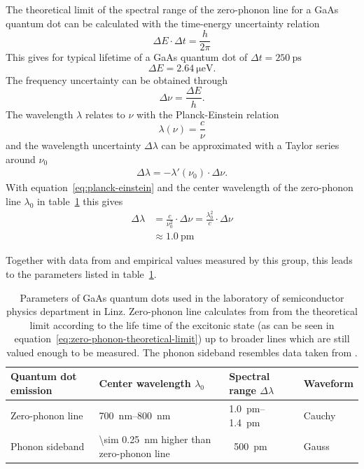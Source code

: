 The theoretical limit of the spectral range of the zero-phonon line for a GaAs quantum dot can be calculated with the time-energy uncertainty relation
\begin{equation}
\Delta E \cdot \Delta t = \frac{h}{2 \pi}
\end{equation}
This gives for typical lifetime of a GaAs quantum dot of $\Delta t = \SI{250}{\pico \second}$
\begin{equation}
\Delta E = \SI{2.64}{\micro \electronvolt}.
\end{equation}
The frequency uncertainty can be obtained through
\begin{equation}
\label{eq:planck-einstein}
\Delta \nu = \frac{\Delta E}{h}.
\end{equation}
The wavelength $\lambda$ relates to $\nu$ with the Planck-Einstein relation
\begin{equation}
\lambda(\nu) = \frac{c}{\nu}
\end{equation}
and the wavelength uncertainty $\Delta \lambda$ can be approximated with a Taylor series around $\nu_0$
\begin{align}
\Delta \lambda = - \lambda'(\nu_0)\cdot \Delta \nu.
\end{align}
With equation~\eqref{eq:planck-einstein} and the center wavelength of the zero-phonon line $\lambda_{0}$ in table~\ref{tab:quantum-dot-emission} this gives
\begin{align}
\Delta \lambda &= \frac{c}{\nu_0^2} \cdot \Delta \nu = \frac{\lambda_0^2}{c}\cdot\Delta \nu\\
\label{eq:zero-phonon-theoretical-limit}
&\approx \SI{1.0}{\pico \metre}
\end{align}

Together with data from \textcite{scholl_resonance_2019} and empirical values measured by this group, this leads to the parameters listed in table~\ref{tab:quantum-dot-emission}.

\begin{table}[H]
	\caption[Paramters of GaAs quantum dots used in the laboratory of semiconductor physics department in Linz.]{Parameters of GaAs quantum dots used in the laboratory of semiconductor physics department in Linz.
		Zero-phonon line calculates from from the theoretical limit according to the life time of the excitonic state (as can be seen in equation~\eqref{eq:zero-phonon-theoretical-limit}) up to broader lines which are still valued enough to be measured.
		The phonon sideband resembles data taken from \textcite{scholl_resonance_2019}.}
	\label{tab:quantum-dot-emission}
	\begin{tabular}{@{}llll@{}}
		\toprule
		Quantum dot emission & Center wavelength $\lambda_0$           & Spectral range $\Delta \lambda$ & Waveform                  \\ \midrule
		Zero-phonon line               & \SIrange{700}{800}{\nano \metre} & \SIrange{1.0}{1.4}{\pico \metre} & Cauchy\\
		Phonon sideband       & \SI{\sim 0.25}{\nano \metre} higher than zero-phonon line  & ~\SI{500}{\pico \metre} & Gauss  \\ \bottomrule
	\end{tabular}
\end{table}



